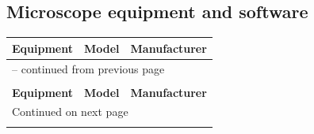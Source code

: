 \subsection{Microscope equipment and software}

\begin{center}
\begin{longtable}{lll}
\label{tab:microscope_eqipiment} \\
\textbf{Equipment} & \textbf{Model} & \textbf{Manufacturer} 
\\ \hline 
\endfirsthead
\hline
\multicolumn{3}{|l|}{{ -- continued from previous page}} \\
\hline
&& \\



\textbf{Equipment} & \textbf{Model} & \textbf{Manufacturer}\\ 
\hline 
\endhead

\hline
\multicolumn{3}{|l|}{{Continued on next page}} \\ 
\hline
\endfoot

\hline


\end{longtable}
\end{center}
